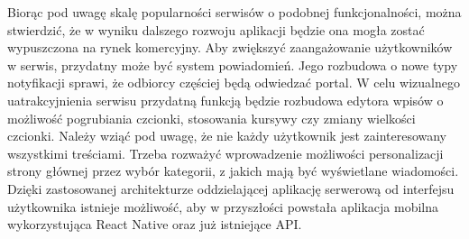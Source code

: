\documentclass[declaration,shortabstract]{iithesis}
\begin{document}
Biorąc pod uwagę skalę popularności serwisów o podobnej funkcjonalności, można stwierdzić, że w wyniku dalszego rozwoju aplikacji będzie ona mogła zostać wypuszczona na rynek komercyjny. Aby zwiększyć zaangażowanie użytkowników w serwis, przydatny może być system powiadomień. Jego rozbudowa o nowe typy notyfikacji sprawi, że odbiorcy częściej będą odwiedzać portal. W celu wizualnego uatrakcyjnienia serwisu przydatną funkcją będzie rozbudowa edytora wpisów o możliwość pogrubiania czcionki, stosowania kursywy czy zmiany wielkości czcionki. Należy wziąć pod uwagę, że nie każdy użytkownik jest zainteresowany wszystkimi treściami. Trzeba rozważyć wprowadzenie możliwości personalizacji strony głównej przez wybór kategorii, z jakich mają być wyświetlane wiadomości. Dzięki zastosowanej architekturze oddzielającej aplikację serwerową od interfejsu użytkownika istnieje możliwość, aby w przyszłości powstała aplikacja mobilna wykorzystująca React Native oraz już istniejące API.



\end{document}
